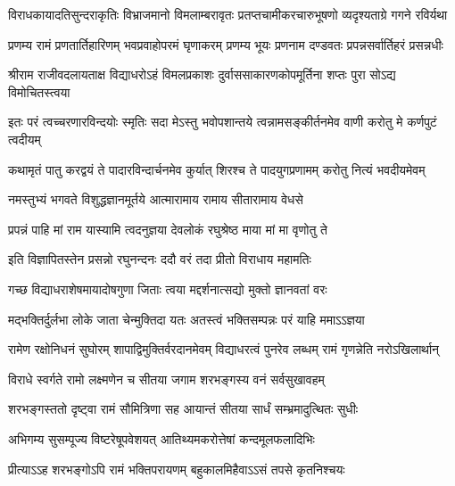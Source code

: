 \fourlineindentedshloka
{विराधकायादतिसुन्दराकृतिः}
{विभ्राजमानो विमलाम्बरावृतः}
{प्रतप्तचामीकरचारुभूषणो}
{व्यदृश्यताग्रे गगने रविर्यथा} %

\fourlineindentedshloka
{प्रणम्य रामं प्रणतार्तिहारिणम्}
{भवप्रवाहोपरमं घृणाकरम्}
{प्रणम्य भूयः प्रणनाम दण्डवतः}
{प्रपन्नसर्वार्तिहरं प्रसन्नधीः} %


\fourlineindentedshloka
{श्रीराम राजीवदलायताक्ष}
{विद्याधरोऽहं विमलप्रकाशः}
{दुर्वाससाकारणकोपमूर्तिना}
{शप्तः पुरा सोऽद्य विमोचितस्त्वया} %

\fourlineindentedshloka
{इतः परं त्वच्चरणारविन्दयोः}
{स्मृतिः सदा मेऽस्तु भवोपशान्तये}
{त्वन्नामसङ्कीर्तनमेव वाणी}
{करोतु मे कर्णपुटं त्वदीयम्} %

\fourlineindentedshloka
{कथामृतं पातु करद्वयं ते}
{पादारविन्दार्चनमेव कुर्यात्}
{शिरश्च ते पादयुगप्रणामम्}
{करोतु नित्यं भवदीयमेवम्} %

\twolineshloka
{नमस्तुभ्यं भगवते विशुद्धज्ञानमूर्तये}
{आत्मारामाय रामाय सीतारामाय वेधसे} %

\twolineshloka
{प्रपन्नं पाहि मां राम यास्यामि त्वदनुज्ञया}
{देवलोकं रघुश्रेष्ठ माया मां मा वृणोतु ते} %

\twolineshloka
{इति विज्ञापितस्तेन प्रसन्नो रघुनन्दनः}
{ददौ वरं तदा प्रीतो विराधाय महामतिः} %

\twolineshloka
{गच्छ विद्याधराशेषमायादोषगुणा जिताः}
{त्वया मद्दर्शनात्सद्यो मुक्तो ज्ञानवतां वरः} %

\twolineshloka
{मद्भक्तिर्दुर्लभा लोके जाता चेन्मुक्तिदा यतः}
{अतस्त्वं भक्तिसम्पन्नः परं याहि ममाऽऽज्ञया} %

\fourlineindentedshloka
{रामेण रक्षोनिधनं सुघोरम्}
{शापाद्विमुक्तिर्वरदानमेवम्}
{विद्याधरत्वं पुनरेव लब्धम्}
{रामं गृणन्नेति नरोऽखिलार्थान्} %






\twolineshloka
{विराधे स्वर्गते रामो लक्ष्मणेन च सीतया}
{जगाम शरभङ्गस्य वनं सर्वसुखावहम्} %

\twolineshloka
{शरभङ्गस्ततो दृष्ट्वा रामं सौमित्रिणा सह}
{आयान्तं सीतया सार्धं सम्भ्रमादुत्थितः सुधीः} %

\twolineshloka
{अभिगम्य सुसम्पूज्य विष्टरेषूपवेशयत्}
{आतिथ्यमकरोत्तेषां कन्दमूलफलादिभिः} %

\twolineshloka
{प्रीत्याऽऽह शरभङ्गोऽपि रामं भक्तिपरायणम्}
{बहुकालमिहैवाऽऽसं तपसे कृतनिश्चयः} %

